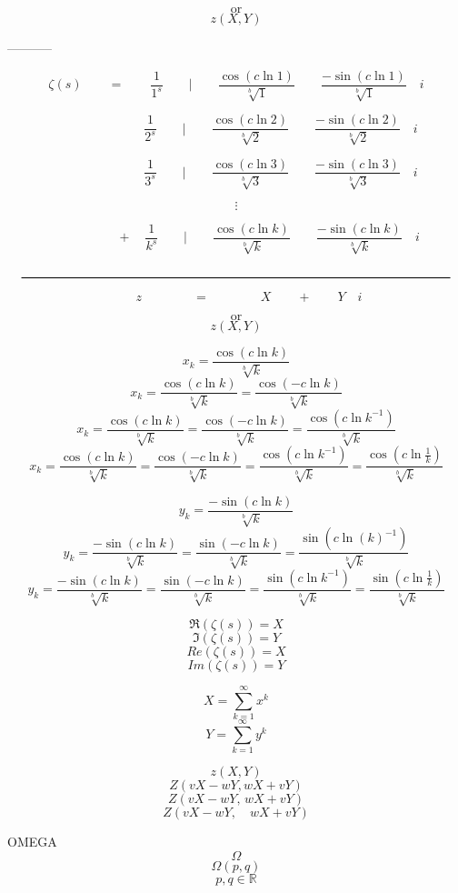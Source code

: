 \documentclass{amsart}
\begin{document}
	\[ \text{or} \]
	\[ z (X, Y) \]
	
	-----------
	
	\[ \zeta(s) \qquad = \qquad \frac{1}{1^s} \qquad \Big|  \qquad \frac{\cos({c\ln 1})}{\sqrt[b]{1}} \qquad \frac{-\sin({c\ln 1})}{\sqrt[b]{1}} \quad i  \]
	
	\[ \quad \qquad  \qquad \qquad \frac{1}{2^s} \qquad \Big|  \qquad \frac{\cos({c\ln 2})}{\sqrt[b]{2}} \qquad \frac{-\sin({c\ln 2})}{\sqrt[b]{2}} \quad i  \]
	
	\[ \quad \qquad  \qquad \qquad \frac{1}{3^s} \qquad \Big|  \qquad \frac{\cos({c\ln 3})}{\sqrt[b]{3}} \qquad \frac{-\sin({c\ln 3})}{\sqrt[b]{3}} \quad i  \]
	
	\[ \vdots \]
	
	\[ \qquad \qquad \quad + \quad \frac{1}{k^s} \qquad \Big|  \qquad \frac{\cos({c\ln k})}{\sqrt[b]{k}} \qquad \frac{-\sin({c\ln k})}{\sqrt[b]{k}} \quad i  \]
	
	\[\quad \rule{12 cm}{.8pt} \quad \]
	\[ \qquad \qquad \qquad z \qquad\qquad =  \qquad\qquad X \qquad + \qquad Y \quad i \qquad\qquad \]
	
	\[ \text{or} \]
	\[ z (X, Y) \]
	
	\[ x_k = \frac{\cos({c\ln k})}{\sqrt[b]{k}} \]
	\[ x_k = \frac{\cos({c\ln k})}{\sqrt[b]{k}} = \frac{\cos(-{c\ln k})}{\sqrt[b]{k}} \]
	\[ x_k = \frac{\cos({c\ln k})}{\sqrt[b]{k}} = \frac{\cos(-{c\ln k})}{\sqrt[b]{k}} = \frac{\cos({c\ln k^{-1}})}{\sqrt[b]{k}} \]
	\[ x_k = \frac{\cos({c\ln k})}{\sqrt[b]{k}} = \frac{\cos(-{c\ln k})}{\sqrt[b]{k}} = \frac{\cos({c\ln k^{-1}})}{\sqrt[b]{k}} = \frac{\cos({c\ln \frac{1}{k}})}{\sqrt[b]{k}} \]
	
	
	\[ y_k = \frac{-\sin({c\ln k})}{\sqrt[b]{k}} \]
	\[ y_k = \frac{-\sin({c\ln k})}{\sqrt[b]{k}} = \frac{\sin({-c\ln k})}{\sqrt[b]{k}} = \frac{\sin({c\ln (k)^{-1}})}{\sqrt[b]{k}} \]
	\[ y_k = \frac{-\sin({c\ln k})}{\sqrt[b]{k}} = \frac{\sin({-c\ln k})}{\sqrt[b]{k}} = \frac{\sin({c\ln k^{-1}})}{\sqrt[b]{k}} = \frac{\sin({c\ln \frac1k })}{\sqrt[b]{k}} \]
	
	\[ \Re(\zeta(s)) = X \]
	\[ \Im(\zeta(s)) = Y \]
	\[ Re(\zeta(s)) = X \]
	\[ Im(\zeta(s)) = Y \]
	
	\[ X = \sum\limits_{k=1}^{\infty}x^k \]
	\[ Y = \sum\limits_{k=1}^{\infty}y^k \]
	
	
	\[ z(X,Y) \]
	\[ Z(vX-wY, wX+vY) \]
	\[ Z(vX-wY, \, wX+vY) \]
	\[ Z(vX-wY, \quad wX+vY) \]
	
	
	\newpage
	OMEGA
	\[ \Omega \]
	\[ \Omega(p, q)  \]
	\[ p, q \in \mathbb{R}  \]
	
\end{document}
